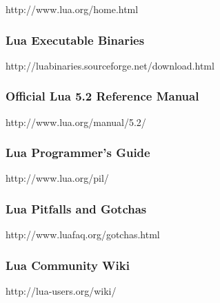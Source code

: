 http://www.lua.org/home.html

\subsubsection{Lua Executable Binaries}

http://luabinaries.sourceforge.net/download.html

\subsubsection{Official Lua 5.2 Reference Manual}

http://www.lua.org/manual/5.2/

\subsubsection{Lua Programmer's Guide}

http://www.lua.org/pil/

\subsubsection{Lua Pitfalls and Gotchas}

http://www.luafaq.org/gotchas.html

\subsubsection{Lua Community Wiki}

http://lua-users.org/wiki/
